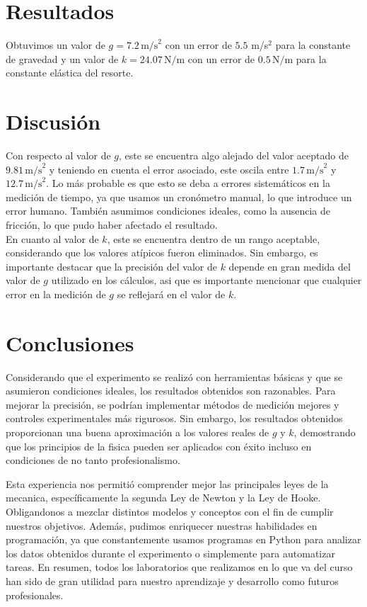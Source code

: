 \documentclass{article}
\begin{document}
\section*{Resultados}
Obtuvimos un valor de $g = 7.2 \, \text{m/s}^2$ con un error de $5.5$ m/s$^2$
para la constante de gravedad y un valor de $k = 24.07 \,
\text{N/m}$ con un error de $0.5 \, \text{N/m}$ para la constante elástica 
del resorte.

\section*{Discusión}
Con respecto al valor de $g$, este se encuentra algo alejado del 
valor aceptado de $9.81 \,\text{m/s}^2$ y teniendo en cuenta el error asociado,
este oscila entre $1.7 \,\text{m/s}^2$ y $12.7 \,\text{m/s}^2$. Lo más probable
es que esto se deba a errores sistemáticos en la medición
de tiempo, ya que usamos un cronómetro manual, lo que introduce un error
humano. También asumimos condiciones ideales, como la ausencia de fricción,
lo que pudo haber afectado el resultado. \\

En cuanto al valor de $k$, este se encuentra dentro de un rango aceptable,
considerando que los valores atípicos fueron eliminados. Sin embargo,
es importante destacar que la precisión del valor de $k$ depende en gran
medida del valor de $g$ utilizado en los cálculos, asi que es importante 
mencionar que cualquier error en la medición de $g$ se reflejará en el valor 
de $k$.
 

\section*{Conclusiones}
Considerando que el experimento se realizó con herramientas básicas y
que se asumieron condiciones ideales, los resultados obtenidos son
razonables. Para mejorar la precisión, se podrían implementar
métodos de medición mejores y controles experimentales más rigurosos.
Sin embargo, los resultados obtenidos proporcionan una buena aproximación
a los valores reales de $g$ y $k$, demostrando que los principios 
de la fisica pueden ser aplicados con éxito incluso en condiciones 
de no tanto profesionalismo.

Esta experiencia nos permitió comprender mejor las principales leyes 
de la mecanica, específicamente la segunda Ley de Newton y la Ley de Hooke.
Obligandonos a mezclar distintos modelos y conceptos con el fin de cumplir
nuestros objetivos.
Además, pudimos enriquecer nuestras habilidades en programación, ya que
constantemente usamos programas en Python para analizar los datos obtenidos
durante el experimento o simplemente para automatizar tareas. En resumen, 
todos los laboratorios que realizamos en lo que va del curso han sido de 
gran utilidad para nuestro aprendizaje y desarrollo como futuros 
profesionales.
\vspace{1.3cm}
\end{document}
